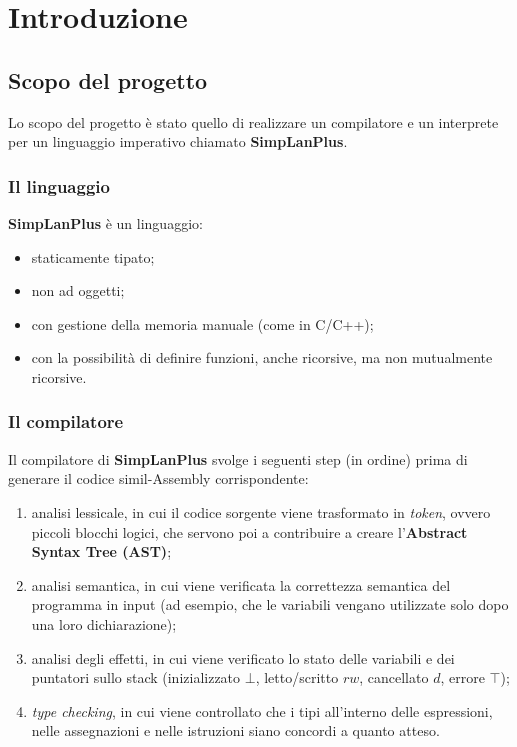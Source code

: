 \documentclass[../report.tex]{subfiles}
\begin{document}
\chapter{Introduzione}\label{c:introduzione}
\section{Scopo del progetto}\label{s:scopo-progetto}
Lo scopo del progetto è stato quello di realizzare un compilatore e un interprete per un linguaggio imperativo chiamato \textbf{SimpLanPlus}.

\subsection{Il linguaggio}
\textbf{SimpLanPlus} è un linguaggio:
\begin{itemize}
    \item staticamente tipato;
    \item non ad oggetti;
    \item con gestione della memoria manuale (come in C/C++);
    \item con la possibilità di definire funzioni, anche ricorsive, ma non mutualmente ricorsive.
\end{itemize}

\subsection{Il compilatore}
Il compilatore di \textbf{SimpLanPlus} svolge i seguenti step (in ordine) prima di generare il codice simil-Assembly corrispondente:
\begin{enumerate}
    \item analisi lessicale, in cui il codice sorgente viene trasformato in \textit{token}, ovvero piccoli blocchi logici, che servono poi a contribuire a creare l'\textbf{Abstract Syntax Tree (AST)};
    \item analisi semantica, in cui viene verificata la correttezza semantica del programma in input (ad esempio, che le variabili vengano utilizzate solo dopo una loro dichiarazione);
    \item analisi degli effetti, in cui viene verificato lo stato delle variabili e dei puntatori sullo stack (inizializzato $\bot$, letto/scritto $rw$, cancellato $d$, errore $\top$);
    \item \textit{type checking}, in cui viene controllato che i tipi all'interno delle espressioni, nelle assegnazioni e nelle istruzioni siano concordi a quanto atteso.
\end{enumerate}
\end{document}
